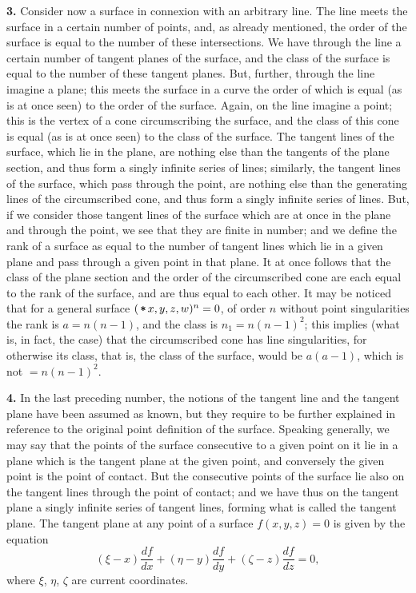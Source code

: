 \documentclass[11pt,a4paper]{book}
\begin{document}
\textbf{3.}\quad
Consider now a surface in connexion with an arbitrary line. The line meets the surface in a certain number of points, and, as already mentioned, the order of the surface is equal to the number of these intersections. We have through the line a certain number of tangent planes of the surface, and the class of the surface is equal to the number of these tangent planes. But, further, through the line imagine a plane; this meets the surface in a curve the order of which is equal (as is at once seen) to the order of the surface. Again, on the line imagine a point; this is the vertex of a cone circumscribing the surface, and the class of this cone is equal (as is at once seen) to the class of the surface. The tangent lines of the surface, which lie in the plane, are nothing else than the tangents of the plane section, and thus form a singly infinite series of lines; similarly, the tangent lines of the surface, which pass through the point, are nothing else than the generating lines of the circumscribed cone, and thus form a singly infinite series of lines. But, if we consider those tangent lines of the surface which are at once in the plane and through the point, we see that they are finite in number; and we define the rank of a surface as equal to the number of tangent lines which lie in a given plane and pass through a given point in that plane. It at once follows that the class of the plane section and the order of the circumscribed cone are each equal to the rank of the surface, and are thus equal to each other. It may be noticed that for a general surface $(\,\raisebox{0.15ex}{\ensuremath{*\!\!\!*}}\, x, y, z, w)^{n} = 0$, of order $n$ without point singularities the rank is $a = n(n - 1)$, and the class is $n_{1} = n(n - 1)^{2}$; this implies (what is, in fact, the case) that the circumscribed cone has line singularities, for otherwise its class, that is, the class of the surface, would be $a(a - 1)$, which is not $= n(n - 1)^{2}$.

\textbf{4.}\quad
In the last preceding number, the notions of the tangent line and the tangent plane have been assumed as known, but they require to be further explained in reference to the original point definition of the surface. Speaking generally, we may say that the points of the surface consecutive to a given point on it lie in a plane which is the tangent plane at the given point, and conversely the given point is the point of contact. But the consecutive points of the surface lie also on the tangent lines through the point of contact; and we have thus on the tangent plane a singly infinite series of tangent lines, forming what is called the tangent plane. The tangent plane at any point of a surface $f(x, y, z) = 0$ is given by the equation
\[
(\xi - x)\frac{df}{dx} + (\eta - y)\frac{df}{dy} + (\zeta - z)\frac{df}{dz} = 0,
\]
where $\xi$, $\eta$, $\zeta$ are current coordinates.
\end{document}

